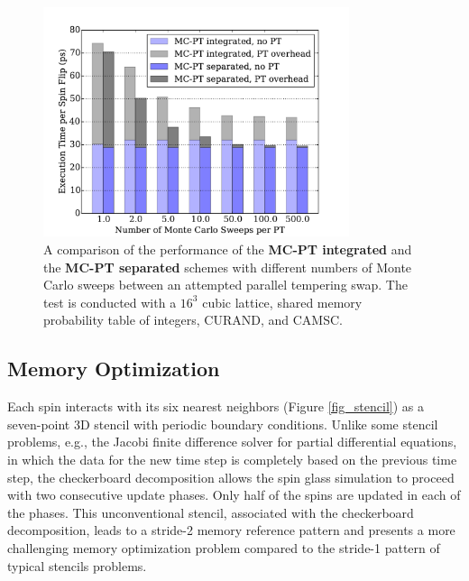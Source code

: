\begin{figure}[ht]
  \centering
  \includegraphics[width=0.8\textwidth] {img/korg.pdf}
  \caption{A comparison of the performance of the {\bf MC-PT integrated} and the {\bf MC-PT separated} schemes
with different numbers of Monte Carlo sweeps between an attempted parallel tempering swap.
The test is conducted with a $16^3$ cubic lattice, shared memory probability table of integers, CURAND, 
and CAMSC. }
  \label{fig_korg}
  \end{figure}



\subsection{Memory Optimization}

\label{section_memory}


Each spin interacts with its six nearest neighbors (Figure
\ref{fig_stencil}) as a seven-point 3D stencil
\cite{Nguyen:2010:BOS:1884643.1884658, Datta:2008:SCO:1413370.1413375} with periodic boundary
conditions.  Unlike some stencil problems, e.g., the Jacobi finite
difference solver for partial differential equations, in which the
data for the new time step is completely based on the previous time
step, the checkerboard decomposition allows the spin glass simulation
to proceed with two consecutive update phases. Only half of the spins are
updated in each of the phases. This unconventional stencil, associated
with the checkerboard decomposition, leads to a stride-2 memory
reference pattern and presents a more challenging memory optimization
problem compared to the stride-1 pattern of typical stencils problems.



